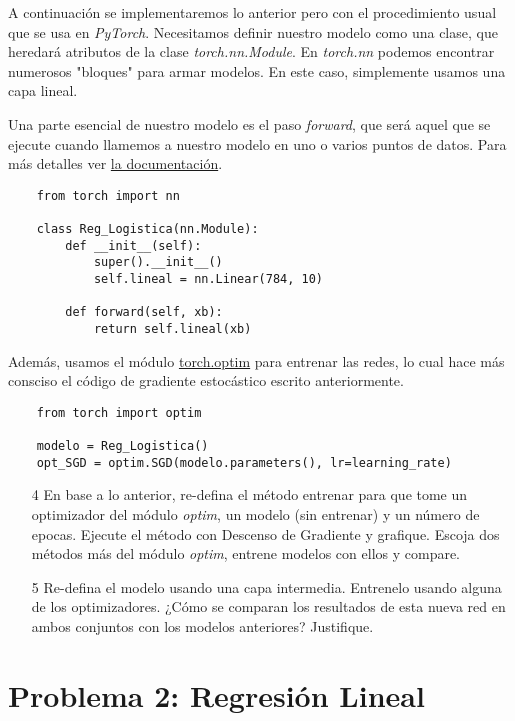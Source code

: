A continuación se implementaremos lo anterior pero con el procedimiento usual que se usa en \textit{PyTorch}. Necesitamos definir nuestro modelo como una clase, que heredará atributos de la clase \textit{torch.nn.Module}. En \textit{torch.nn} podemos encontrar numerosos "bloques" para armar modelos. En este caso, simplemente usamos una capa lineal.

\newp Una parte esencial de nuestro modelo es el paso \textit{forward}, que será aquel que se ejecute cuando llamemos a nuestro modelo en uno o varios puntos de datos. Para más detalles ver \href{https://pytorch.org/docs/stable/nn.html}{la documentación}.

\begin{verbatim}
    from torch import nn

    class Reg_Logistica(nn.Module):
        def __init__(self):
            super().__init__()
            self.lineal = nn.Linear(784, 10)
    
        def forward(self, xb):
            return self.lineal(xb)
\end{verbatim}

Además, usamos el módulo \href{https://pytorch.org/docs/stable/optim.html}{torch.optim} para entrenar las redes, lo cual hace más consciso el código de gradiente estocástico escrito anteriormente.

\begin{verbatim}
    from torch import optim

    modelo = Reg_Logistica()
    opt_SGD = optim.SGD(modelo.parameters(), lr=learning_rate)
\end{verbatim}

\begin{itemize}
    \item[4] En base a lo anterior, re-defina el método entrenar para que tome un optimizador del módulo \textit{optim}, un modelo (sin entrenar) y un número de epocas. Ejecute el método con Descenso de Gradiente y grafique. Escoja dos métodos más del módulo \textit{optim}, entrene modelos con ellos y compare.
    \item[5] Re-defina el modelo usando una capa intermedia. Entrenelo usando alguna de los optimizadores. ¿Cómo se comparan los resultados de esta nueva red en ambos conjuntos con los modelos anteriores? Justifique.
\end{itemize}

\section*{Problema 2: Regresión Lineal}

